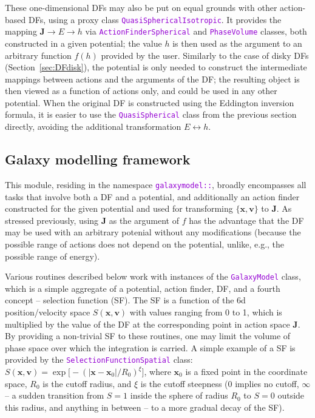 \documentclass[12pt]{article}
\newcommand{\ttt}[1]{\textcolor{darkviolet}{\texttt{#1}}}
\newcommand{\bv}{\boldsymbol{v}}
\newcommand{\bx}{\boldsymbol{x}}
\newcommand{\bJ}{\boldsymbol{J}}
\begin{document}
These one-dimensional DFs may also be put on equal grounds with other action-based DFs, using a proxy class \ttt{QuasiSphericalIsotropic}. It provides the mapping $\bJ \to E \to h$ via \ttt{ActionFinderSpherical} and \ttt{PhaseVolume} classes, both constructed in a given potential; the value $h$ is then used as the argument to an arbitrary function $f(h)$ provided by the user. Similarly to the case of disky DFs (Section~\ref{sec:DFdisk}), the potential is only needed to construct the intermediate mappings between actions and the arguments of the DF; the resulting object is then viewed as a function of actions only, and could be used in any other potential.
When the original DF is constructed using the Eddington inversion formula, it is easier to use the \ttt{QuasiSpherical} class from the previous section directly, avoiding the additional transformation $E\leftrightarrow h$.


\subsection{Galaxy modelling framework}  \label{sec:GalaxyModel}

This module, residing in the namespace \ttt{galaxymodel::}, broadly encompasses all tasks that involve both a DF and a potential, and additionally an action finder constructed for the given potential and used for transforming $\{\bx,\bv\}$ to $\bJ$.
As stressed previously, using $\bJ$ as the argument of $f$ has the advantage that the DF may be used with an arbitrary potenial without any modifications (because the possible range of actions does not depend on the potential, unlike, e.g., the possible range of energy).

Various routines described below work with instances of the \ttt{GalaxyModel} class, which is a simple aggregate of a potential, action finder, DF, and a fourth concept -- selection function (SF). The SF is a function of the 6d position/velocity space $S(\bx,\bv)$ with values ranging from 0 to 1, which is multiplied by the value of the DF at the corresponding point in action space $\bJ$. By providing a non-trivial SF to these routines, one may limit the volume of phase space over which the integration is carried. A simple example of a SF is provided by the \ttt{SelectionFunctionSpatial} class: $S(\bx, \bv) = \exp\big[-(|\bx-\bx_0|/R_0)^\xi\big]$, where $\bx_0$ is a fixed point in the coordinate space, $R_0$ is the cutoff radius, and $\xi$ is the cutoff steepness (0 implies no cutoff, $\infty$ -- a sudden transition from $S=1$ inside the sphere of radius $R_0$ to $S=0$ outside this radius, and anything in between -- to a more gradual decay of the SF).
\end{document}
